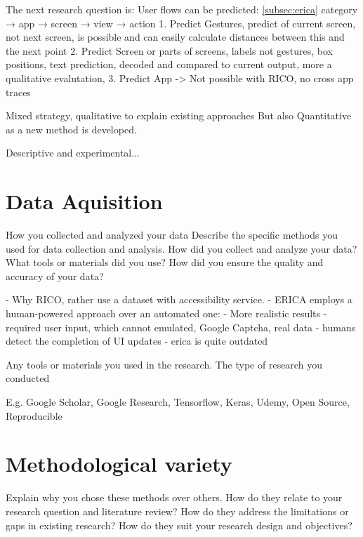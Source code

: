 The next research question is: 
User flows can be predicted: \ref{subsec:erica}
category → app → screen → view → action
1. Predict Gestures, predict of current screen, not next screen, is possible and can easily calculate distances between this and the next point
2. Predict Screen or parts of screens, labels not gestures, box positions, text prediction, decoded and compared to current output, more a qualitative evalutation,
3. Predict App -> Not possible with RICO, no cross app traces


Mixed strategy, qualitative to explain existing approaches
But also Quantitative as a new method is developed.

Descriptive and experimental...


\section{Data Aquisition}
How you collected and analyzed your data
Describe the specific methods you used for data collection and analysis.
How did you collect and analyze your data?
What tools or materials did you use?
How did you ensure the quality and accuracy of your data?

- Why RICO, rather use a dataset with accessibility service.
- ERICA employs a human-powered approach over an automated one:
    - More realistic results
    - required user input, which cannot emulated, Google Captcha, real data
    - humans detect the completion of UI updates \cite{deka2016erica}
    - erica is quite outdated


Any tools or materials you used in the research.
The type of research you conducted

E.g. Google Scholar, Google Research, Tensorflow, Keras, Udemy, Open Source, Reproducible

\section{Methodological variety}
Explain why you chose these methods over others.
How do they relate to your research question and literature review?
How do they address the limitations or gaps in existing research?
How do they suit your research design and objectives?

